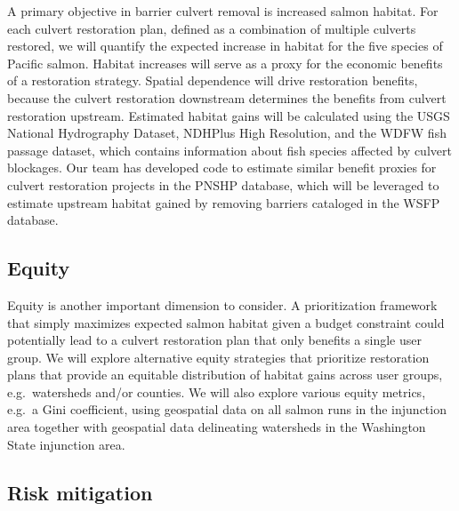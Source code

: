 \documentclass[12pt]{elsarticle}
\begin{document}
A primary objective in barrier culvert removal is increased salmon habitat. For each culvert restoration plan, defined as a combination of multiple culverts restored, we will quantify the expected increase in habitat for the five species of Pacific salmon. Habitat increases will serve as a proxy for the economic benefits of a restoration strategy. Spatial dependence will drive restoration benefits, because the culvert restoration downstream determines the benefits from culvert restoration upstream. Estimated habitat gains will be calculated using the USGS National Hydrography Dataset, NDHPlus High Resolution, and the WDFW fish passage dataset, which contains information about fish species affected by culvert blockages.  Our team has developed code to estimate similar benefit proxies for culvert restoration projects in the PNSHP database, which will be leveraged to estimate upstream habitat gained by removing barriers cataloged in the WSFP database. 

\subsection{Equity}

Equity is another important dimension to consider. A prioritization framework that simply maximizes expected salmon habitat given a budget constraint could potentially lead to a culvert restoration plan that only benefits a single user group. We will explore alternative equity strategies that prioritize restoration plans that provide an equitable distribution of habitat gains across user groups, e.g.\ watersheds and/or counties. We will also explore various equity metrics, e.g.\ a Gini coefficient, using geospatial data on all salmon runs in the injunction area together with geospatial data delineating watersheds in the Washington State injunction area. 

\subsection{Risk mitigation}
\end{document}
